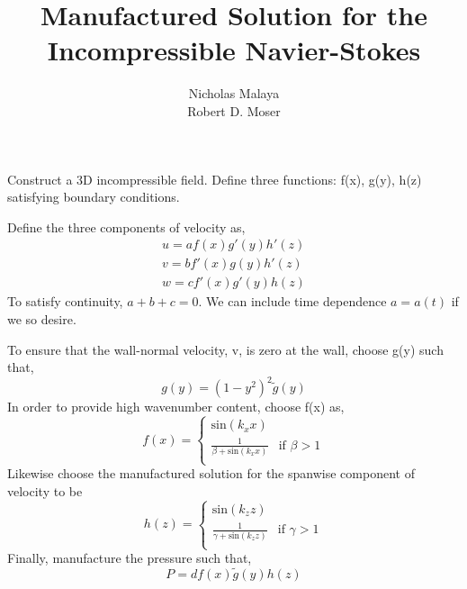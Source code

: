 \documentclass{article}
\title{\bf{Manufactured Solution for the Incompressible Navier-Stokes}}
\author{Nicholas Malaya \\ Robert D. Moser} \date{}
\begin{document}
\maketitle

Construct a 3D incompressible field. Define three functions: f(x), g(y),
h(z) satisfying boundary conditions. 

Define the three components of velocity as,
\begin{align}
u = a f(x)  g'(y)  h'(z) \\
v = b f'(x) g(y)   h'(z) \\
w = c f'(x) g'(y)  h(z) 
\end{align}
To satisfy continuity, $a+b+c=0$. We can include time dependence
$a=a(t)$ if we so desire.

To ensure that the wall-normal velocity, v, is  zero at the wall, choose
g(y) such that, 
\begin{equation}
 g(y) = (1-y^2)^2 \tilde g(y)
\end{equation}
In order to provide high wavenumber content, choose f(x) as,
\begin{equation}
 f(x) =
  \begin{cases}
   \text{sin}(k_x x)  \\
   \frac{1}{\beta + \text{sin}(k_x x)} & \mbox{if } \beta > 1 \\
  \end{cases}
\end{equation}
Likewise choose the manufactured solution for the spanwise component of
velocity to be
\begin{equation}
 h(z) =
  \begin{cases}
   \text{sin}(k_z z)  \\
   \frac{1}{\gamma + \text{sin}(k_z z)} & \mbox{if } \gamma > 1 \\
  \end{cases}
\end{equation}
Finally, manufacture the pressure such that, 
\begin{equation}
 P = d f(x) \tilde g(y) h(z)
\end{equation}
\end{document}

